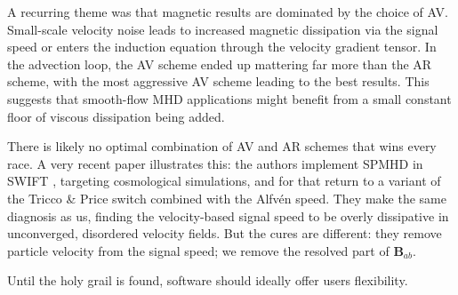 A recurring theme was that magnetic results are dominated by the choice of AV. Small-scale velocity noise leads to increased magnetic dissipation via the signal speed or enters the induction equation through the velocity gradient tensor. In the advection loop, the AV scheme ended up mattering far more than the AR scheme, with the most aggressive AV scheme leading to the best results. This suggests that smooth-flow MHD applications might benefit from a small constant floor of viscous dissipation being added. 

There is likely no optimal combination of AV and AR schemes that wins every race. A very recent paper \cite{Karapiperis2026} illustrates this: the authors implement SPMHD in \textsc{SWIFT} \cite{Schaller2024}, targeting cosmological simulations, and for that return to a variant of the Tricco \& Price switch combined with the Alfvén speed. They make the same diagnosis as us, finding the velocity-based signal speed to be overly dissipative in unconverged, disordered velocity fields. But the cures are different: they remove particle velocity from the signal speed; we remove the resolved part of $\mathbf{B}_{ab}$.

Until the holy grail is found, software should ideally offer users flexibility. 


